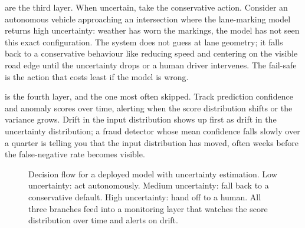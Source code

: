  are the third layer.
When uncertain, take the conservative action.
Consider an autonomous vehicle approaching an intersection where the lane-marking model returns high uncertainty: weather has worn the markings, the model has not seen this exact configuration.
The system does not guess at lane geometry; it falls back to a conservative behaviour like reducing speed and centering on the visible road edge until the uncertainty drops or a human driver intervenes.
The fail-safe is the action that costs least if the model is wrong.

 is the fourth layer, and the one most often skipped.
Track prediction confidence and anomaly scores over time, alerting when the score distribution shifts or the variance grows.
Drift in the input distribution shows up first as drift in the uncertainty distribution; a fraud detector whose mean confidence falls slowly over a quarter is telling you that the input distribution has moved, often weeks before the false-negative rate becomes visible.

\begin{figure}
\centering
{}
\caption{Decision flow for a deployed model with uncertainty estimation. Low uncertainty: act autonomously. Medium uncertainty: fall back to a conservative default. High uncertainty: hand off to a human. All three branches feed into a monitoring layer that watches the score distribution over time and alerts on drift.}
\label{fig:degradation_flow}
\end{figure}

